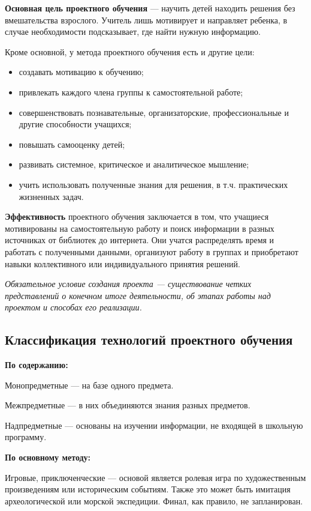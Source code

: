 \documentclass[a4paper, 12pt]{extarticle}
\begin{document}
    \textbf{Основная цель проектного обучения} — научить детей находить решения без вмешательства взрослого. Учитель лишь мотивирует и направляет ребенка, в случае необходимости подсказывает, где найти нужную информацию.

Кроме основной, у метода проектного обучения есть и другие цели:
\begin{itemize}
    \item создавать мотивацию к обучению;
    \item привлекать каждого члена группы к самостоятельной работе;
    \item совершенствовать познавательные, организаторские, профессиональные и другие способности учащихся;
    \item повышать самооценку детей;
    \item развивать системное, критическое и аналитическое мышление;
    \item учить использовать полученные знания для решения, в т.ч. практических жизненных задач.
\end{itemize}
    

\textbf{Эффективность} проектного обучения заключается в том, что учащиеся мотивированы на самостоятельную работу и поиск информации в разных источниках от библиотек до интернета. Они учатся распределять время и работать с полученными данными, организуют работу в группах и приобретают навыки коллективного или индивидуального принятия решений.

   \textit{Обязательное условие создания проекта — существование четких представлений о конечном итоге деятельности, об этапах работы над проектом и способах его реализации.}

\subsection*{Классификация технологий проектного обучения}

\textbf{По содержанию:}

    
    Монопредметные — на базе одного предмета.

    Межпредметные — в них объединяются знания разных предметов.
    
    Надпредметные — основаны на изучении информации, не входящей в школьную программу.

\textbf{По основному методу:}

    Игровые, приключенческие — основой является ролевая игра по художественным произведениям или историческим событиям. Также это может быть имитация археологической или морской экспедиции. Финал, как правило, не запланирован.
    
\end{document}
